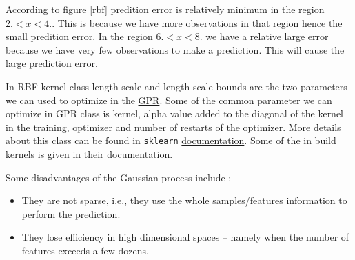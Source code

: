 \documentclass{article}
\begin{document}
According to figure \ref{rbf} predition error is relatively minimum in the region $2. < x < 4.$. This is because we have more observations in that region hence the small predition error. In the region $6. < x < 8.$ we have a relative large error because we have very few observations to make a prediction. This will cause the large prediction error.

In RBF kernel class length scale and length scale bounds are the two parameters we can used to optimize in the \href{https://scikit-learn.org/stable/modules/generated/sklearn.gaussian_process.kernels.RBF.html}{GPR}. Some of the common parameter we can optimize in GPR class is kernel, alpha value added to the diagonal of the kernel in the training, optimizer and number of restarts of the optimizer. More details about this class can be found in \verb|sklearn| \href{https://scikit-learn.org/stable/modules/generated/sklearn.gaussian_process.GaussianProcessRegressor.html} {documentation}. Some of the in build kernels is given in their \href{https://scikit-learn.org/stable/modules/gaussian_process.html#kernels-for-gaussian-processes}{documentation}.

Some disadvantages of the Gaussian process include \cite{scikit-learn};

\begin{itemize}
\item They are not sparse, i.e., they use the whole samples/features information to perform the prediction.
\item They lose efficiency in high dimensional spaces – namely when the number of features exceeds a few dozens.
\end{itemize}


\printbibliography
\end{document}
